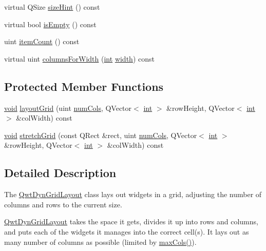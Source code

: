 \begin{DoxyCompactItemize}
\item 
virtual Q\-Size \hyperlink{class_qwt_dyn_grid_layout_afed46e3a8e1b6e67dcf62eca0bc948d6}{size\-Hint} () const 
\item 
virtual bool \hyperlink{class_qwt_dyn_grid_layout_a755f41277b43417d6b719704dc2c0d29}{is\-Empty} () const 
\item 
uint \hyperlink{class_qwt_dyn_grid_layout_ad7df7a3f47055041d6dd5ab1c4c660e0}{item\-Count} () const 
\item 
virtual uint \hyperlink{class_qwt_dyn_grid_layout_adf7cc1acc36b41086fb4815633473901}{columns\-For\-Width} (\hyperlink{ioapi_8h_a787fa3cf048117ba7123753c1e74fcd6}{int} \hyperlink{glext_8h_a76aaa5c50746272e7d2de9aece921757}{width}) const 
\end{DoxyCompactItemize}
\subsection*{Protected Member Functions}
\begin{DoxyCompactItemize}
\item 
\hyperlink{group___u_a_v_objects_plugin_ga444cf2ff3f0ecbe028adce838d373f5c}{void} \hyperlink{class_qwt_dyn_grid_layout_aab4aede7957a5a84403cb88da387d8dc}{layout\-Grid} (uint \hyperlink{class_qwt_dyn_grid_layout_a4678cd0f67c332162c266ac9661b5db6}{num\-Cols}, Q\-Vector$<$ \hyperlink{ioapi_8h_a787fa3cf048117ba7123753c1e74fcd6}{int} $>$ \&row\-Height, Q\-Vector$<$ \hyperlink{ioapi_8h_a787fa3cf048117ba7123753c1e74fcd6}{int} $>$ \&col\-Width) const 
\item 
\hyperlink{group___u_a_v_objects_plugin_ga444cf2ff3f0ecbe028adce838d373f5c}{void} \hyperlink{class_qwt_dyn_grid_layout_aba94fa07d16ec2d36589b777dc853605}{stretch\-Grid} (const Q\-Rect \&rect, uint \hyperlink{class_qwt_dyn_grid_layout_a4678cd0f67c332162c266ac9661b5db6}{num\-Cols}, Q\-Vector$<$ \hyperlink{ioapi_8h_a787fa3cf048117ba7123753c1e74fcd6}{int} $>$ \&row\-Height, Q\-Vector$<$ \hyperlink{ioapi_8h_a787fa3cf048117ba7123753c1e74fcd6}{int} $>$ \&col\-Width) const 
\end{DoxyCompactItemize}


\subsection{Detailed Description}
The \hyperlink{class_qwt_dyn_grid_layout}{Qwt\-Dyn\-Grid\-Layout} class lays out widgets in a grid, adjusting the number of columns and rows to the current size. 

\hyperlink{class_qwt_dyn_grid_layout}{Qwt\-Dyn\-Grid\-Layout} takes the space it gets, divides it up into rows and columns, and puts each of the widgets it manages into the correct cell(s). It lays out as many number of columns as possible (limited by \hyperlink{class_qwt_dyn_grid_layout_a6ffaad457d8c9b4d423c23fb6b433299}{max\-Cols()}). 

